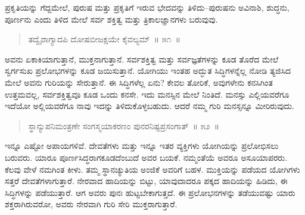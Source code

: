 \vspace{-0.4cm}


\vspace{0.1cm}

ಪ್ರಕೃತಿಯನ್ನು ಗೆದ್ದಮೇಲೆ, ಪುರುಷ ಮತ್ತು ಪ್ರಕೃತಿಗೆ ಇರುವ ಭೇದವನ್ನು ತಿಳಿದು–ಪುರುಷನು ಅವಿನಾಶಿ, ಶುದ್ಧನು, ಪೂರ್ಣನು ಎಂದು ತಿಳಿದ ಮೇಲೆ ಸರ್ವ ಶಕ್ತಿತ್ವ ಮತ್ತು ತ್ರಿಕಾಲಜ್ಞಾನಗಳು ಬರುವುವು. 

\vspace{-0.3cm}

\begin{verse}
ತದ್ವೈರಾಗ್ಯಾದಪಿ ದೋಷಬೀಜಕ್ಷಯೇ ಕೈವಲ್ಯಮ್​~॥ ೫೧~॥
\end{verse}

\vspace{-0.4cm}


\vspace{0.1cm}

ಅವನು ಏಕಾಕಿಯಾಗುತ್ತಾನೆ, ಮುಕ್ತನಾಗುತ್ತಾನೆ. ಸರ್ವಶಕ್ತಿತ್ವ ಮತ್ತು ಸರ್ವಜ್ಞತೆಗಳನ್ನು ಕೂಡ ತೊರೆದ ಮೇಲೆ ಸ್ವರ್ಗಸುಖ ಪ್ರಲೋಭಗಳನ್ನು ಕೂಡ ಜಯಿಸುತ್ತಾನೆ. ಯೋಗಿಯು ಇಂತಹ ಅದ್ಭುತ ಸಿದ್ಧಿಗಳನ್ನೆಲ್ಲ ನೋಡಿ ತ್ಯಜಿಸಿದ ಮೇಲೆ ಅವನು ಗುರಿಯನ್ನು ಸೇರುತ್ತಾನೆ. ಈ ಸಿದ್ಧಿಗಳೆಲ್ಲ ಏನು? ಕೇವಲ ತೋರಿಕೆ, ಅವುಗಳೇನು ಕನಸಿಗಿಂತ ಉತ್ತಮವಲ್ಲ, ಸರ್ವಶಕ್ತಿತ್ವವೂ ಕೂಡ ಒಂದು ಕನಸೇ. ಇದು ಮನಸ್ಸಿನ ಮೇಲೆ ನಿಂತಿದೆ. ಮನಸ್ಸು ಎಲ್ಲಿಯವರೆಗೂ ಇದೆಯೋ ಅಲ್ಲಿಯವರೆಗೂ ನಾವು ಇದನ್ನು ತಿಳಿದುಕೊಳ್ಳಬಹುದು. ಆದರೆ ನಮ್ಮ ಗುರಿ ಮನಸ್ಸನ್ನೂ ಮೀರಿರುವುದು. 

\vspace{-0.2cm}

\begin{verse}
ಸ್ಥಾನ್ಯುಪನಿಮಂತ್ರಣೇ ಸಂಗಸ್ಮಯಾಕರಣಂ ಪುನರನಿಷ್ಟಪ್ರಸಂಗಾತ್​~॥ ೫೨~॥
\end{verse}

\vspace{-0.4cm}


\vspace{0.1cm}

ಇನ್ನೂ ಎಷ್ಟೋ ಅಪಾಯಗಳಿವೆ. ದೇವತೆಗಳು ಮತ್ತು ಇನ್ನೂ ಇತರ ವ್ಯಕ್ತಿಗಳು ಯೋಗಿಯನ್ನು ಪ್ರಲೋಭಿಸಲು ಬರುವರು. ಯಾರೂ ಪೂರ್ಣಸಿದ್ಧರಾಗಕೂಡದೆಂಬುದೆ ಅವರ ಬಯಕೆ. ನಮ್ಮಂತೆಯೆ ಅವರೂ ಅಸೂಯಾಪರರು. ಕೆಲವು ವೇಳೆ ನಮಗಿಂತ ಕೀಳು. ತಮ್ಮ ಸ್ಥಾನಚ್ಯುತಿಯ ಅಂಜಿಕೆ ಅವರಿಗೆ ಬಹಳ. ಮುಕ್ತಿಯನ್ನು ಪಡೆಯದ ಯೋಗಿಗಳು ಸತ್ತರೆ ದೇವತೆಗಳಾಗುತ್ತಾರೆ. ನೇರವಾದ ಹಾದಿಯನ್ನು ಬಿಟ್ಟು, ಯಾವುದಾದರೂ ಪಕ್ಕದ ಹಾದಿಯನ್ನು ಹಿಡಿದು, ಈ ಸಿದ್ಧಿಗಳನ್ನು ಪಡೆಯುತ್ತಾರೆ. ಆಗ ಅವರು ಪುನಃ ಹುಟ್ಟಬೇಕಾಗುತ್ತದೆ. ಈ ಪ್ರಲೋಭನಗಳನ್ನು ತಡೆಯುವಷ್ಟು ಯಾರು ಶಕ್ತರಾಗಿರುವರೋ, ಅವರು ನೇರವಾಗಿ ಗುರಿ ಸೇರಿ ಮುಕ್ತರಾಗುತ್ತಾರೆ. 

